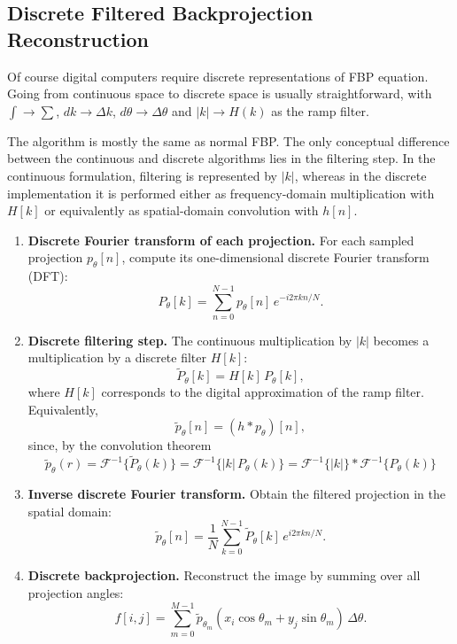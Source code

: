 \documentclass[../../../main.tex]{subfiles}
\begin{document}
\subsection{Discrete Filtered Backprojection Reconstruction}
Of course digital computers require discrete representations of FBP equation.
Going from continuous space to discrete space is usually straightforward, with $\int \rightarrow \sum $, $dk\rightarrow\Delta k$, $d\theta\rightarrow\Delta \theta$ and $|k|\rightarrow H(k)$ as the ramp filter.

The algorithm is mostly the same as normal FBP.
The only conceptual difference between the continuous and discrete algorithms lies in the filtering step.
In the continuous formulation, filtering is represented by $|k|$,  whereas in the discrete implementation it is performed either as frequency-domain multiplication with $H[k]$ or equivalently as spatial-domain convolution with $h[n]$.
\begin{enumerate}
    \item \textbf{Discrete Fourier transform of each projection.}
          For each sampled projection $p_\theta[n]$, compute its one-dimensional discrete Fourier transform (DFT):
          \[
              P_\theta[k] = \sum_{n=0}^{N-1} p_\theta[n]\, e^{-i 2\pi kn / N}.
          \]

    \item \textbf{Discrete filtering step.}
          The continuous multiplication by $|k|$ becomes a multiplication by a discrete filter $H[k]$:
          \[
              \tilde{P}_\theta[k] = H[k]\, P_\theta[k],
          \]
          where $H[k]$ corresponds to the digital approximation of the ramp filter.
          Equivalently,
          \[
              \tilde{p}_\theta[n] = (h * p_\theta)[n],
          \]
          since, by the convolution theorem
          \[
              \tilde{p}_{\theta}(r)
              = \mathcal{F}^{-1}\{\tilde{P}_{\theta}(k)\}
              = \mathcal{F}^{-1}\{|k|\,P_{\theta}(k)\}
              = \mathcal{F}^{-1}\{|k|\} * \mathcal{F}^{-1}\{P_{\theta}(k)\}
          \]

    \item \textbf{Inverse discrete Fourier transform.}
          Obtain the filtered projection in the spatial domain:
          \[
              \tilde{p}_\theta[n] = \frac{1}{N} \sum_{k=0}^{N-1} \tilde{P}_\theta[k]\, e^{i 2\pi kn / N}.
          \]

    \item \textbf{Discrete backprojection.}
          Reconstruct the image by summing over all projection angles:
          \[
              f[i,j] = \sum_{m=0}^{M-1} \tilde{p}_{\theta_m}(x_i\cos\theta_m + y_j\sin\theta_m)\, \Delta\theta.
          \]
\end{enumerate}
\end{document}
